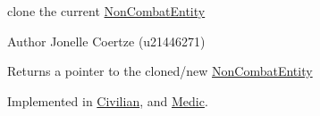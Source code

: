 clone the current \mbox{\hyperlink{class_non_combat_entity}{Non\+Combat\+Entity}} 

\begin{DoxyAuthor}{Author}
Jonelle Coertze (u21446271) 
\end{DoxyAuthor}
\begin{DoxyReturn}{Returns}
a pointer to the cloned/new \mbox{\hyperlink{class_non_combat_entity}{Non\+Combat\+Entity}} 
\end{DoxyReturn}


Implemented in \mbox{\hyperlink{class_civilian_a5c7b7c3b4832ba0d6509e8b87fac87e1}{Civilian}}, and \mbox{\hyperlink{class_medic_a973bcb165d5cb3d3b4f522496234f690}{Medic}}.

